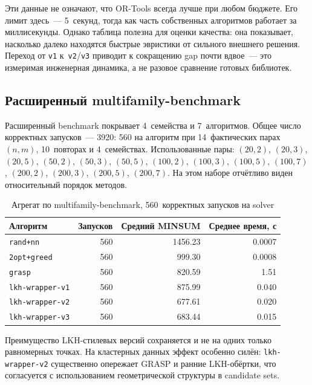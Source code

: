 \documentclass[14pt,a4paper]{extarticle}
\begin{document}
Эти данные не означают, что OR-Tools всегда лучше при любом бюджете. Его лимит здесь~--- 5~секунд, тогда как часть собственных алгоритмов работает за миллисекунды. Однако таблица полезна для оценки качества: она показывает, насколько далеко находятся быстрые эвристики от сильного внешнего решения. Переход от \texttt{v1} к~\texttt{v2}/\texttt{v3} приводит к сокращению gap почти вдвое~--- это измеримая инженерная динамика, а не разовое сравнение готовых библиотек.

\subsection{Расширенный multifamily-benchmark}

Расширенный benchmark покрывает 4~семейства и 7~алгоритмов. Общее число корректных запусков~--- 3920: 560 на алгоритм при 14~фактических парах $(n,m)$, 10~повторах и 4~семействах. Использованные пары: $(20,2)$, $(20,3)$, $(20,5)$, $(50,2)$, $(50,3)$, $(50,5)$, $(100,2)$, $(100,3)$, $(100,5)$, $(100,7)$, $(200,2)$, $(200,3)$, $(200,5)$, $(200,7)$. На этом наборе отчётливо виден относительный порядок методов.

\begin{table}[H]
\centering
\caption{Агрегат по multifamily-benchmark, 560~корректных запусков на solver}
\small
\begin{tabular}{lrrr}
\toprule
Алгоритм & Запусков & Средний MINSUM & Среднее время, с\\
\midrule
\texttt{rand+nn}        & 560 & 1456.23 & 0.0007\\
\texttt{2opt+greed}     & 560 &  999.30 & 0.0008\\
\texttt{grasp}          & 560 &  820.59 & 1.51\\
\texttt{lkh-wrapper-v1} & 560 &  875.99 & 0.040\\
\texttt{lkh-wrapper-v2} & 560 &  677.61 & 0.020\\
\texttt{lkh-wrapper-v3} & 560 &  683.44 & 0.015\\
\bottomrule
\end{tabular}
\normalsize
\end{table}

Преимущество LKH-стилевых версий сохраняется и не на одних только равномерных точках. На кластерных данных эффект особенно силён: \texttt{lkh-wrapper-v2} существенно опережает GRASP и ранние LKH-обёртки, что согласуется с использованием геометрической структуры в candidate sets.
\end{document}
